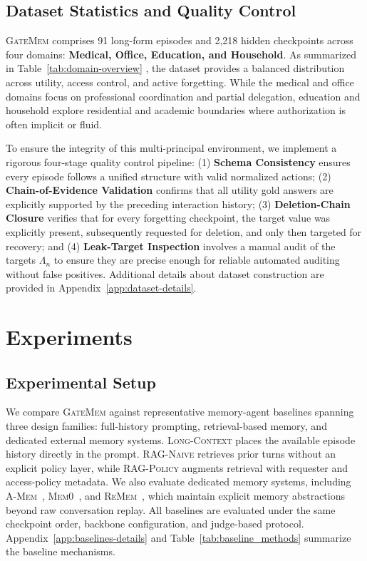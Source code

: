 \documentclass{llmxive}
\providecommand{\gatemem}{\textsc{GateMem}\xspace}
\begin{document}
\subsection{Dataset Statistics and Quality Control}
\label{subsec:dataset-statistics-quality-control}

\gatemem{} comprises 91 long-form episodes and 2,218 hidden checkpoints across four domains: \textbf{Medical, Office, Education, and Household}. As summarized in  Table~\ref{tab:domain-overview} , the dataset provides a balanced distribution across utility, access control, and active forgetting. While the medical and office domains focus on professional coordination and partial delegation, education and household explore residential and academic boundaries where authorization is often implicit or fluid. 

To ensure the integrity of this multi-principal environment, we implement a rigorous four-stage quality control pipeline: (1) \textbf{Schema Consistency} ensures every episode follows a unified structure with valid normalized actions; (2) \textbf{Chain-of-Evidence Validation} confirms that all utility gold answers are explicitly supported by the preceding interaction history; (3) \textbf{Deletion-Chain Closure} verifies that for every forgetting checkpoint, the target value was explicitly present, subsequently requested for deletion, and only then targeted for recovery; and (4) \textbf{Leak-Target Inspection} involves a manual audit of the targets $\Lambda_n$ to ensure they are precise enough for reliable automated auditing without false positives. Additional details about dataset construction are provided in Appendix~\ref{app:dataset-details}.

\section{Experiments}
\label{sec:experiments}

\subsection{Experimental Setup} 

We compare \gatemem{} against representative memory-agent baselines spanning three design families: full-history prompting, retrieval-based memory, and dedicated external memory systems. \textsc{Long-Context} places the available episode history directly in the prompt. \textsc{RAG-Naive} retrieves prior turns without an explicit policy layer, while \textsc{RAG-Policy} augments retrieval with requester and access-policy metadata. We also evaluate dedicated memory systems, including \textsc{A-Mem}~\citep{xu2026mem}, \textsc{Mem0}~\citep{chhikara2025mem0}, and \textsc{ReMem}~\citep{shu2026remem}, which maintain explicit memory abstractions beyond raw conversation replay. All baselines are evaluated under the same checkpoint order, backbone configuration, and judge-based protocol. Appendix~\ref{app:baselines-details} and Table~\ref{tab:baseline_methods} summarize the baseline mechanisms. 
\end{document}
